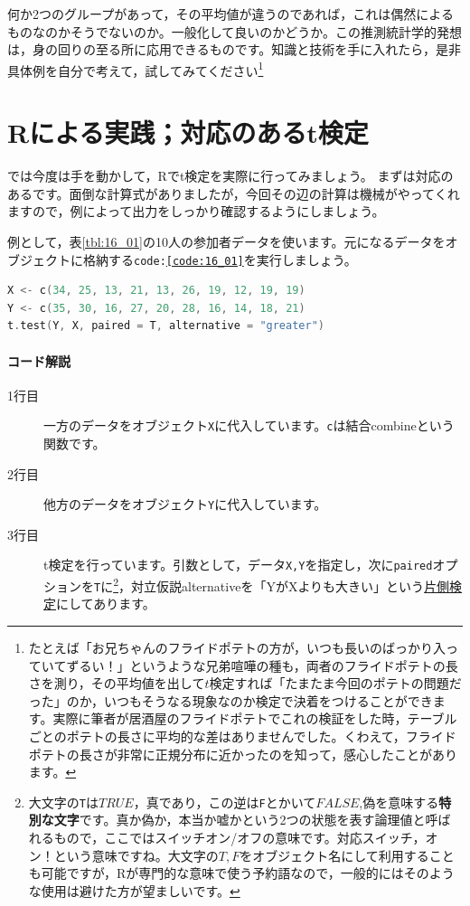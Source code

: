 \documentclass{ltjsbook}
\begin{document}
何か2つのグループがあって，その平均値が違うのであれば，これは偶然によるものなのかそうでないのか。一般化して良いのかどうか。この推測統計学的発想は，身の回りの至る所に応用できるものです。知識と技術を手に入れたら，是非具体例を自分で考えて，試してみてください\footnote{たとえば「お兄ちゃんのフライドポテトの方が，いつも長いのばっかり入っていてずるい！」というような兄弟喧嘩の種も，両者のフライドポテトの長さを測り，その平均値を出して$t$検定すれば「たまたま今回のポテトの問題だった」のか，いつもそうなる現象なのか検定で決着をつけることができます。実際に筆者が居酒屋のフライドポテトでこれの検証をした時，テーブルごとのポテトの長さに平均的な差はありませんでした。くわえて，フライドポテトの長さが非常に正規分布に近かったのを知って，感心したことがあります。}


\section{Rによる実践；対応のあるt検定}
では今度は手を動かして，Rでt検定を実際に行ってみましょう。
まずは対応のあるです。面倒な計算式がありましたが，今回その辺の計算は機械がやってくれますので，例によって出力をしっかり確認するようにしましょう。

例として，表\ref{tbl:16_01}の10人の参加者データを使います。元になるデータをオブジェクトに格納する\texttt{code:\ref{code:16_01}}を実行しましょう。
\begin{lstlisting}[language=c++,label={code:16_01},caption={t検定を行う}]
X <- c(34, 25, 13, 21, 13, 26, 19, 12, 19, 19)
Y <- c(35, 30, 16, 27, 20, 28, 16, 14, 18, 21)
t.test(Y, X, paired = T, alternative = "greater")
\end{lstlisting}

\paragraph{コード解説}
\begin{description}
	\item[1行目] 一方のデータをオブジェクト\texttt{X}に代入しています。\texttt{c}は結合combineという関数です。
	\item[2行目] 他方のデータをオブジェクト\texttt{Y}に代入しています。
	\item[3行目] t検定を行っています。引数として，データ\texttt{X,Y}を指定し，次に\texttt{paired}オプションを\texttt{T}に\footnote{大文字の\texttt{T}は$TRUE$，真であり，この逆は\texttt{F}とかいて$FALSE$,偽を意味する\textbf{特別な文字}です。真か偽か，本当か嘘かという2つの状態を表す論理値と呼ばれるもので，ここではスイッチオン/オフの意味です。対応スイッチ，オン！という意味ですね。大文字の$T,F$をオブジェクト名にして利用することも可能ですが，Rが専門的な意味で使う予約語なので，一般的にはそのような使用は避けた方が望ましいです。}，対立仮説alternativeを「YがXよりも大きい」という\underline{片側検定}にしてあります。
\end{description}
\end{document}
